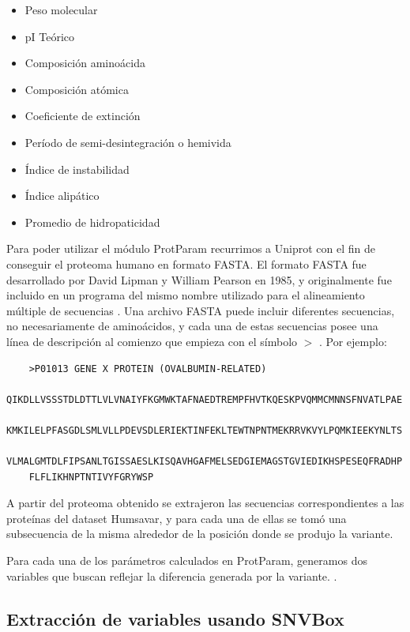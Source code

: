 \begin{itemize}
    \item Peso molecular
    \item pI Teórico
    \item Composición aminoácida
    \item Composición atómica
    \item Coeficiente de extinción
    \item Período de semi-desintegración o hemivida
    \item Índice de instabilidad
    \item Índice alipático
    \item Promedio de hidropaticidad
\end{itemize}

Para poder utilizar el módulo ProtParam recurrimos a Uniprot con el fin de conseguir el proteoma humano en formato FASTA. El formato FASTA fue desarrollado por David Lipman y William Pearson en 1985, y originalmente fue incluido en un programa del mismo nombre utilizado para el alineamiento múltiple de secuencias \todo{[ref]}. Una archivo FASTA puede incluir diferentes secuencias, no necesariamente de aminoácidos, y cada una de estas secuencias posee una línea de descripción al comienzo que empieza con el símbolo $>$ \todo{[ref]}. Por ejemplo:

\begin{verbatim}
	>P01013 GENE X PROTEIN (OVALBUMIN-RELATED)
	QIKDLLVSSSTDLDTTLVLVNAIYFKGMWKTAFNAEDTREMPFHVTKQESKPVQMMCMNNSFNVATLPAE
	KMKILELPFASGDLSMLVLLPDEVSDLERIEKTINFEKLTEWTNPNTMEKRRVKVYLPQMKIEEKYNLTS
	VLMALGMTDLFIPSANLTGISSAESLKISQAVHGAFMELSEDGIEMAGSTGVIEDIKHSPESEQFRADHP
	FLFLIKHNPTNTIVYFGRYWSP
\end{verbatim}


A partir del proteoma obtenido se extrajeron las secuencias correspondientes a las proteínas del dataset Humsavar, y para cada una de ellas se tomó una subsecuencia de la misma alrededor de la posición donde se produjo la variante.

\vspace{2mm}
\vspace{2mm}

Para cada una de los parámetros calculados en ProtParam, generamos dos variables que buscan reflejar la diferencia generada por la variante. .

\subsection{Extracción de variables usando SNVBox}

